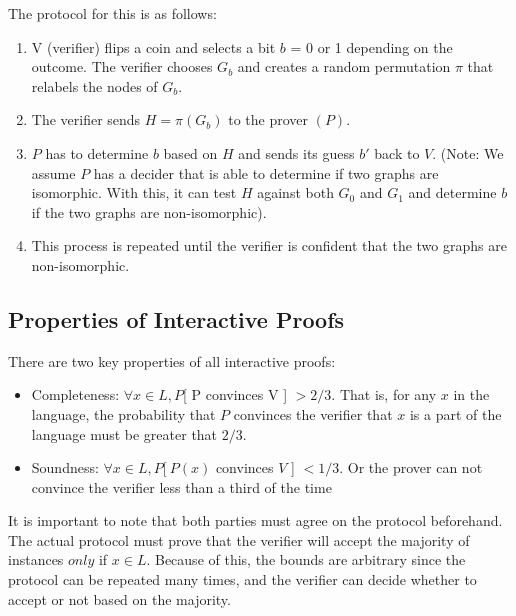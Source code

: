 \documentclass[11pt]{article}
\begin{document}
The protocol for this is as follows:
\begin{enumerate}
    \item V (verifier) flips a coin and selects a bit $b$ = 0 or 1 depending on the outcome. The verifier chooses $G_b$ and creates a random permutation $\pi$ that relabels the nodes of $G_b$.
    \item The verifier sends $H = \pi(G_b)$ to the prover $(P)$.
    \item $P$ has to determine $b$ based on $H$ and sends its guess $b'$ back to $V$. (Note: We assume $P$ has a decider that is able to determine if two graphs are isomorphic. With this, it can test $H$ against both $G_0$ and $G_1$ and determine $b$ if the two graphs are non-isomorphic).
    \item This process is repeated until the verifier is confident that the two graphs are non-isomorphic.
\end{enumerate}
\subsection{Properties of Interactive Proofs}
There are two key properties of all interactive proofs:
\begin{itemize}
\item Completeness: $\forall x\in L, P$[ P convinces V ] $ > 2/3$. That is, for any $x$ in the language, the probability that $P$ convinces the verifier that $x$ is a part of the language must be greater that $2/3$.
\item Soundness: $\forall x\in L, P[\ P(x)$ convinces $V$ ] $< 1/3$. Or the prover can not convince the verifier less than a third of the time
\end{itemize}

It is important to note that both parties must agree on the protocol beforehand. The actual protocol must prove that the verifier will accept the majority of instances $\textit{only}$ if $x \in L$. Because of this, the bounds are arbitrary since the protocol can be repeated many times, and the verifier can decide whether to accept or not based on the majority. 
\end{document}

